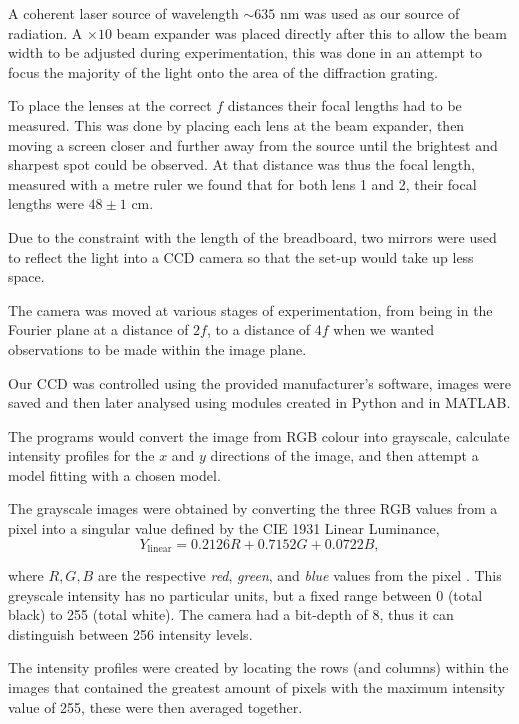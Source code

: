 \documentclass[twocolumn]{revtex4}
\begin{document}
A coherent laser source of wavelength $\sim635$ nm was used as our source of radiation. A $\times10$ beam expander was placed directly after this to allow the beam width to be adjusted during experimentation, this was done in an attempt to focus the majority of the light onto the area of the diffraction grating.

To place the lenses at the correct $f$ distances their focal lengths had to be measured. This was done by placing each lens at the beam expander, then moving a screen closer and further away from the source until the brightest and sharpest spot could be observed. At that distance was thus the focal length, measured with a metre ruler we found that for both lens 1 and 2, their focal lengths were $48\pm1$ cm.

Due to the constraint with the length of the breadboard, two mirrors were used to reflect the light into a CCD camera so that the set-up would take up less space.

The camera was moved at various stages of experimentation, from being in the Fourier plane at a distance of $2f$, to a distance of $4f$ when we wanted observations to be made within the image plane.

Our CCD was controlled using the provided manufacturer's software, images were saved and then later analysed using modules created in Python and in MATLAB. 

The programs would convert the image from RGB colour into grayscale, calculate intensity profiles for the $x$ and $y$ directions of the image, and then attempt a model fitting with a chosen model.

The grayscale images were obtained by converting the three RGB values from a pixel into a singular value defined by the CIE 1931 Linear Luminance,
\begin{equation}
Y_{\text{linear}}=0.2126R+0.7152G+0.0722B,
\end{equation}

where $R,G,B$ are the respective \textit{red}, \textit{green}, and \textit{blue} values from the pixel \cite{rgbtogray}. This greyscale intensity has no particular units, but a fixed range between 0 (total black) to 255 (total white). The camera had a bit-depth of 8, thus it can distinguish between 256 intensity levels.

The intensity profiles were created by locating the rows (and columns) within the images that contained the greatest amount of pixels with the maximum intensity value of 255, these were then averaged together. 
\end{document}
